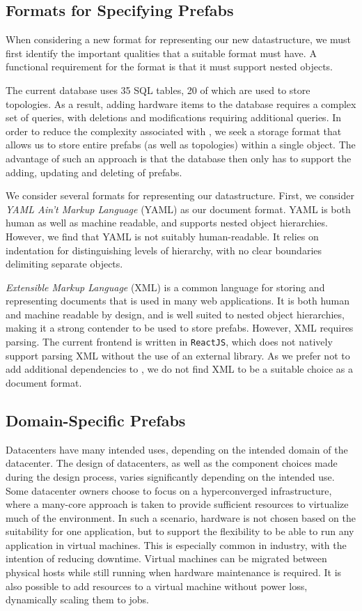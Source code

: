 \documentclass[11pt]{article}
\begin{document}
	\subsection{Formats for Specifying Prefabs}
		When considering a new format for representing our new datastructure, we must first identify the important qualities that a suitable format must have. 
		A functional requirement for the format is that it must support nested objects. 

		The current \opendc{} database uses 35 SQL tables, 20 of which are used to store topologies.
		As a result, adding hardware items to the database requires a complex set of queries, with deletions and modifications requiring additional queries.
		In order to reduce the complexity associated with \opendc{}, we seek a storage format that allows us to store entire prefabs (as well as topologies) within a single object.
		The advantage of such an approach is that the database then only has to support the adding, updating and deleting of prefabs.

		We consider several formats for representing our datastructure.
		First, we consider \textit{YAML Ain't Markup Language} (YAML) as our document format.
		YAML is both human as well as machine readable, and supports nested object hierarchies.
		However, we find that YAML is not suitably human-readable.
		It relies on indentation for distinguishing levels of hierarchy, with no clear boundaries delimiting separate objects.

		\textit{Extensible Markup Language} (XML) is a common language for storing and representing documents that is used in many web applications.
		It is both human and machine readable by design, and is well suited to nested object hierarchies, making it a strong contender to be used to store prefabs.
		However, XML requires parsing.
		The current \opendc{} frontend is written in \verb|ReactJS|, which does not natively support parsing XML without the use of an external library.
		As we prefer not to add additional dependencies to \opendc{}, we do not find XML to be a suitable choice as a document format.
	
	\subsection{Domain-Specific Prefabs}
		Datacenters have many intended uses, depending on the intended domain of the datacenter.
		The design of datacenters, as well as the component choices made during the design process, varies significantly depending on the intended use.
		Some datacenter owners choose to focus on a hyperconverged infrastructure, where a many-core approach is taken to provide sufficient resources to virtualize much of the environment.
		In such a scenario, hardware is not chosen based on the suitability for one application, but to support the flexibility to be able to run any application in virtual machines.
		This is especially common in industry, with the intention of reducing downtime.
		Virtual machines can be migrated between physical hosts while still running when hardware maintenance is required.
		It is also possible to add resources to a virtual machine without power loss, dynamically scaling them to jobs.
\end{document}
